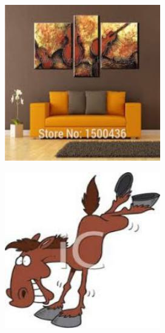 \documentclass{article}
\begin{document}
\begin{center}
\begin{minipage}{0.142\textwidth}
    \end{minipage}%
    \begin{minipage}{0.142\textwidth}
        \includegraphics[width=\linewidth]{./pic/misclassified_r3_p4_2723.jpg}
    \end{minipage}%
    \begin{minipage}{0.142\textwidth}
        \includegraphics[width=\linewidth]{./pic/misclassified_r4_p3_2723.jpg}

\end{minipage}
\end{center}
\end{document}
